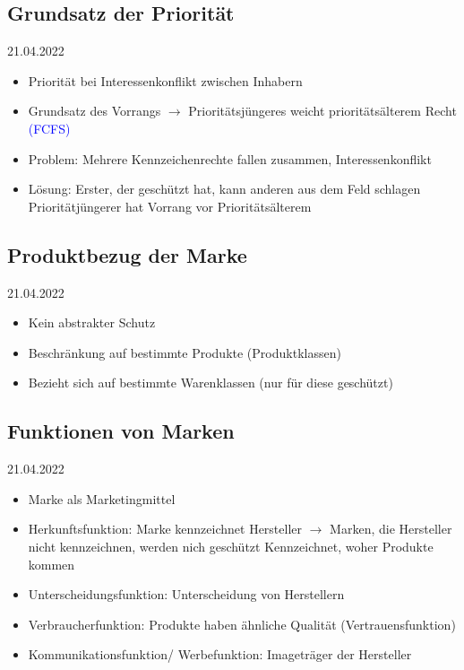 \documentclass{report}
\begin{document}
\subsection{Grundsatz der Priorität}
21.04.2022
\begin{itemize}
	\item Priorität bei Interessenkonflikt zwischen Inhabern
	\item Grundsatz des Vorrangs $\rightarrow$ Prioritätsjüngeres weicht prioritätsälterem Recht \textcolor{blue}{(FCFS)}
	\item Problem: Mehrere Kennzeichenrechte fallen zusammen, Interessenkonflikt
	\item Lösung: Erster, der geschützt hat, kann anderen aus dem Feld schlagen
	\newline Prioritätjüngerer hat Vorrang vor Prioritätsälterem
\end{itemize}

\subsection{Produktbezug der Marke}
21.04.2022
\begin{itemize}
	\item Kein abstrakter Schutz
	\item Beschränkung auf bestimmte Produkte (Produktklassen)
	\item Bezieht sich auf bestimmte Warenklassen (nur für diese geschützt)
\end{itemize}

\subsection{Funktionen von Marken}
21.04.2022
\begin{itemize}
	\item Marke als Marketingmittel
	\item Herkunftsfunktion: Marke kennzeichnet Hersteller
	\newline $\rightarrow$ Marken, die Hersteller nicht kennzeichnen, werden nich geschützt
	\newline Kennzeichnet, woher Produkte kommen
	\item Unterscheidungsfunktion: Unterscheidung von Herstellern
	\item Verbraucherfunktion: Produkte haben ähnliche Qualität (Vertrauensfunktion)
	\item Kommunikationsfunktion/ Werbefunktion: Imageträger der Hersteller
\end{itemize}
\end{document}
